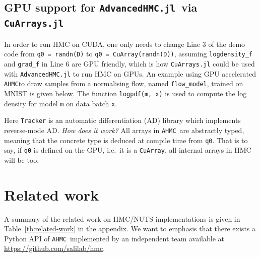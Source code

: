 \documentclass[tablecaption=bottom,wcp]{jmlr} %
\def\ahmc{\texttt{AHMC}}
\def\ahmcfull{\texttt{AdvancedHMC.jl}}
\def\stan{\texttt{Stan}}
\begin{document}
\subsection{GPU support for \ahmcfull~via \texttt{CuArrays.jl}}
In order to run HMC on CUDA, 
one only needs to change Line 3 of the demo code 
from \texttt{q0 = randn(D)} to \texttt{q0 = CuArray(randn(D))}, 
assuming \texttt{logdensity\_f} and \texttt{grad\_f} in Line 6 are GPU friendly, which is how \texttt{CuArrays.jl} could be used with \texttt{AdvancedHMC.jl} to run HMC on GPUs.
An example using GPU accelerated \ahmc\;to draw samples from a normalising flow, named \texttt{flow\_model}, trained on MNIST \citep{lecun1998mnist} is given below. The function \texttt{logpdf(m, x)} is used to compute the log density for model \texttt{m} on data batch \texttt{x}.



Here \texttt{Tracker} is an automatic differentiation (AD) library which implements reverse-mode AD.
\textit{How does it work?}
All arrays in \ahmc~are abstractly typed, meaning that the concrete type is deduced at compile time from \texttt{q0}. That is to say, if \texttt{q0} is defined on the GPU, i.e.~it is a \texttt{CuArray}, all internal arrays in HMC will be too.

\section{Related work}
A summary of the related work on HMC/NUTS implementations is given in Table~\ref{tb:related-work} in the appendix.
We want to emphasis that there exists a Python API of \ahmc~implemented by an independent team available at \url{https://github.com/salilab/hmc}.
%
\end{document}
